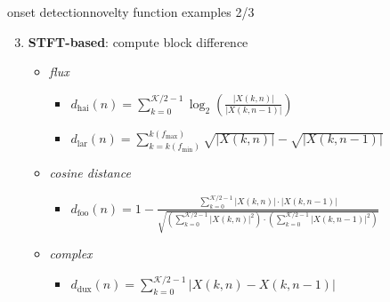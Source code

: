         \begin{frame}{onset detection}{novelty function examples 2/3}
            \begin{enumerate}   
                \setcounter{enumi}{2}
                \item	\textbf{STFT-based}: compute block difference 
                    \begin{itemize}
                        \item	\textit{flux}
                        {
                            \begin{itemize}
                                \item $d_\mathrm{hai}(n) = \sum\limits_{k = 0}^{\mathcal{K}/2-1}{\log_2\left(\frac{|X(k,n)|}{|X(k,n-1)|}\right)}$
                                \item $d_\mathrm{lar}(n) = \sum\limits_{k = k(f_{\mathrm{min}})}^{k(f_{\mathrm{max}})}{\sqrt{|X(k,n)|}-\sqrt{|X(k,n-1)|}}$
                            \end{itemize}
                        }
                        \item<2->	\textit{cosine distance}
                        {
                           \begin{itemize}
                                \item $d_\mathrm{foo}(n)	= 1 - \frac{\sum\limits_{k = 0}^{\mathcal{K}/2-1}{|X(k,n)|\cdot |X(k,n-1)|}}{\sqrt{\left(\sum\limits_{k=0}^{\mathcal{K}/2-1}{|X(k,n)|^2}\right)\cdot \left(\sum\limits_{k=0}^{\mathcal{K}/2-1}{|X(k,n-1)|^2}\right)}}$
                            \end{itemize}
                        }
                        \item<3->	\textit{complex}
                        {
                            \begin{itemize}
                                \item   $d_\mathrm{dux}(n) = \sum\limits_{k = 0}^{\mathcal{K}/2-1}{|X(k,n)-X(k,n-1)|}$
                            \end{itemize}
                        }
                    \end{itemize}
            \end{enumerate}
        \end{frame}
